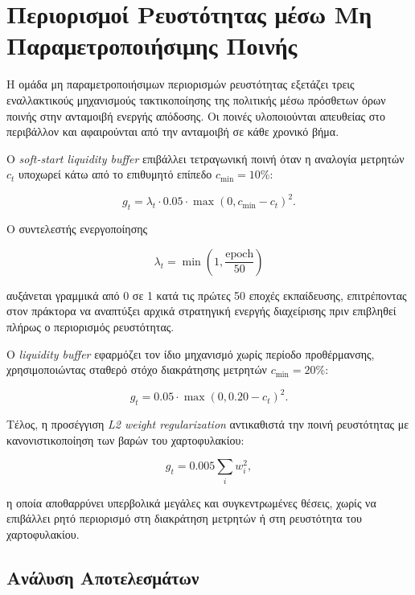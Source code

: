 \section{Περιορισμοί Ρευστότητας μέσω Μη Παραμετροποιήσιμης Ποινής}
\label{sec:exp-hard-liq}

Η ομάδα μη παραμετροποιήσιμων περιορισμών ρευστότητας εξετάζει τρεις εναλλακτικούς
μηχανισμούς τακτικοποίησης της πολιτικής μέσω πρόσθετων όρων ποινής στην ανταμοιβή
ενεργής απόδοσης. Οι ποινές υλοποιούνται απευθείας στο περιβάλλον και αφαιρούνται από
την ανταμοιβή σε κάθε χρονικό βήμα.

Ο \textit{soft-start liquidity buffer} επιβάλλει τετραγωνική ποινή όταν η αναλογία
μετρητών $c_t$ υποχωρεί κάτω από το επιθυμητό επίπεδο $c_{\min}=10\%$:

\begin{equation}
g_t
=
\lambda_t \cdot 0.05
\cdot
\max(0,c_{\min}-c_t)^2.
\end{equation}

Ο συντελεστής ενεργοποίησης

\begin{equation}
\lambda_t
=
\min\!\left(1,\frac{\text{epoch}}{50}\right)
\end{equation}

αυξάνεται γραμμικά από 0 σε 1 κατά τις πρώτες 50 εποχές εκπαίδευσης, επιτρέποντας στον
πράκτορα να αναπτύξει αρχικά στρατηγική ενεργής διαχείρισης πριν επιβληθεί πλήρως ο
περιορισμός ρευστότητας.

Ο \textit{liquidity buffer} εφαρμόζει τον ίδιο μηχανισμό χωρίς περίοδο προθέρμανσης,
χρησιμοποιώντας σταθερό στόχο διακράτησης μετρητών $c_{\min}=20\%$:

\begin{equation}
g_t
=
0.05
\cdot
\max(0,0.20-c_t)^2.
\end{equation}

Τέλος, η προσέγγιση \textit{L2 weight regularization} αντικαθιστά την ποινή
ρευστότητας με κανονιστικοποίηση των βαρών του χαρτοφυλακίου:

\begin{equation}
g_t
=
0.005
\sum_i w_i^2,
\end{equation}

η οποία αποθαρρύνει υπερβολικά μεγάλες και συγκεντρωμένες θέσεις, χωρίς να επιβάλλει
ρητό περιορισμό στη διακράτηση μετρητών ή στη ρευστότητα του χαρτοφυλακίου.

\subsection{Ανάλυση Αποτελεσμάτων}
\label{subsec:exp-hard-liq-design}

